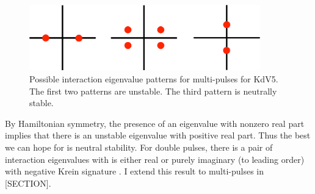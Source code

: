 \documentclass[thesis.tex]{subfiles}
\begin{document}
\begin{figure}[H]
\includegraphics[width=10cm]{images/kdv5/eigdouble2}
\caption{Possible interaction eigenvalue patterns for multi-pulses for KdV5. The first two patterns are unstable. The third pattern is neutrally stable.}
\label{fig:kdv5inteigpattern}
\end{figure}

\noi By Hamiltonian symmetry, the presence of an eigenvalue with nonzero real part implies that there is an unstable eigenvalue with positive real part. Thus the best we can hope for is neutral stability. For double pulses, there is a pair of interaction eigenvalues with is either real or purely imaginary (to leading order) with negative Krein signature \cite[Theorem 2.3]{Pelinovsky2007}. I extend this result to multi-pulses in [SECTION].

\iffulldocument\else
	
	
\fi
\end{document}

